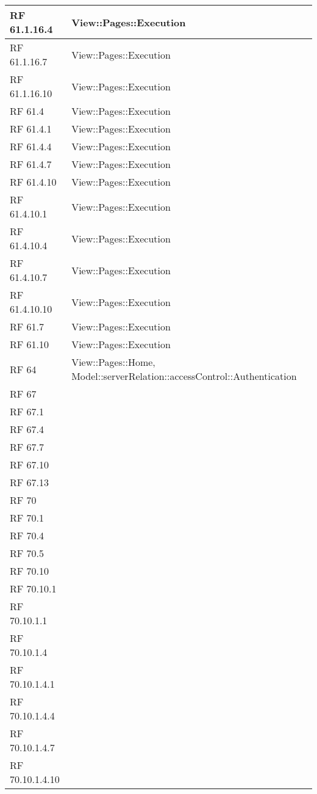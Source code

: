 {\begin{longtable} [c]{| p{2cm} | p{13cm} |}
 \hline 
RF 61.1.16.4 & View::\-Pages::\-Execution\\ 
 \hline 
RF 61.1.16.7 & View::\-Pages::\-Execution\\ 
 \hline 
RF 61.1.16.10 & View::\-Pages::\-Execution\\ 
 \hline 
RF 61.4 & View::\-Pages::\-Execution\\ 
 \hline 
RF 61.4.1 & View::\-Pages::\-Execution\\ 
 \hline 
RF 61.4.4 & View::\-Pages::\-Execution\\ 
 \hline 
RF 61.4.7 & View::\-Pages::\-Execution\\ 
 \hline 
RF 61.4.10 & View::\-Pages::\-Execution\\ 
 \hline 
RF 61.4.10.1 & View::\-Pages::\-Execution\\ 
 \hline 
RF 61.4.10.4 & View::\-Pages::\-Execution\\ 
 \hline 
RF 61.4.10.7 & View::\-Pages::\-Execution\\ 
 \hline 
RF 61.4.10.10 & View::\-Pages::\-Execution\\ 
 \hline 
RF 61.7 & View::\-Pages::\-Execution\\ 
 \hline 
RF 61.10 & View::\-Pages::\-Execution\\ 
 \hline 
RF 64 & View::\-Pages::\-Home, Model::\-serverRelation::\-accessControl::\-Authentication\\ 
 \hline 
RF 67 & \\ 
 \hline 
RF 67.1 & \\ 
 \hline 
RF 67.4 & \\ 
 \hline 
RF 67.7 & \\ 
 \hline 
RF 67.10 & \\ 
 \hline 
RF 67.13 & \\ 
 \hline 
RF 70 & \\ 
 \hline 
RF 70.1 & \\ 
 \hline 
RF 70.4 & \\ 
 \hline 
RF 70.5 & \\ 
 \hline 
RF 70.10 & \\ 
 \hline 
RF 70.10.1 & \\ 
 \hline 
RF 70.10.1.1 & \\ 
 \hline 
RF 70.10.1.4 & \\ 
 \hline 
RF 70.10.1.4.1 & \\ 
 \hline 
RF 70.10.1.4.4 & \\ 
 \hline 
RF 70.10.1.4.7 & \\ 
 \hline 
RF 70.10.1.4.10 & \\ 

\end{longtable}}
